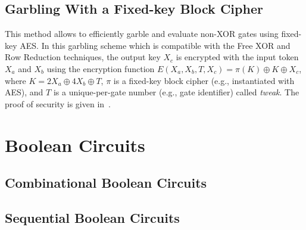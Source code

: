 \subsection{Garbling With a Fixed-key Block Cipher~\cite{bellare2013efficient}}
This method allows to efficiently garble and evaluate non-XOR gates using fixed-key AES.
In this garbling scheme which is compatible with the Free XOR and Row Reduction techniques, the output key $X_{c}$ is encrypted with the input token $X_{a}$ and $X_{b}$ using the encryption function $E(X_a,X_b,T,X_c) = \pi(K) \oplus K \oplus X_c$, where $K=2X_a\oplus4X_b\oplus T$, $\pi$ is a fixed-key block cipher (e.g., instantiated with AES), and $T$ is a unique-per-gate number (e.g., gate identifier) called \emph{tweak}.
The proof of security is given in~\cite{bellare2013efficient}.



\section{Boolean Circuits}
\subsection{Combinational Boolean Circuits}
\subsection{Sequential Boolean Circuits}
